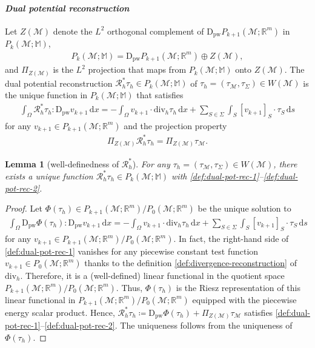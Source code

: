 \documentclass[a4paper]{amsart}
\numberwithin{equation}{section}
\newcommand{\R}{\mathbb{R}}
\renewcommand{\d}[1]{\,\mathrm{d}#1}
\renewcommand{\div}{\mathrm{div}}
\newcommand{\Mcal}{\mathcal{M}}
\newcommand{\pw}{\mathrm{pw}}
\newcommand{\D}{\mathrm{D}}
\newcommand{\M}{\mathbb{M}}
\newtheorem{lemma}[theorem]{Lemma}
\theoremstyle{remark}
\begin{document}
\paragraph{\emph{Dual potential reconstruction}}
Let $Z(\mathcal{M})$ denote the $L^2$ orthogonal complement of $\D_\pw P_{k+1}(\mathcal{M};\mathbb{R}^m)$ in $P_k(\mathcal{M}; \mathbb{M})$,
\begin{align}\label{def:orthogonal-decomposition}
	P_k(\mathcal{M}; \mathbb{M}) = \D_\pw P_{k+1}(\mathcal{M};\mathbb{R}^m) \oplus Z(\mathcal{M}),
\end{align}
and $\Pi_{Z(\Mcal)}$ is the $L^2$ projection that maps from $P_k(\mathcal{M}; \mathbb{M})$ onto $Z(\Mcal)$.
The dual potential reconstruction $\mathcal{R}_h^* \tau_h \in P_k(\mathcal{M}; \mathbb{M})$ of $\tau_h = (\tau_\Mcal,\tau_\Sigma) \in W(\Mcal)$ is 
the unique function in $P_k(\Mcal;\M)$ that satisfies
\begin{align}\label{def:dual-pot-rec-1}
	\int_\Omega \mathcal{R}_h^* \tau_h : \D_\pw v_{k+1} \d{x} = - \int_\Omega v_{k+1} \cdot \div_h \tau_h \d{x} + \sum_{S \in \Sigma} \int_S [v_{k+1}]_S \cdot \tau_S \d{s}
\end{align}
for any $v_{k+1} \in P_{k+1}(\Mcal;\R^m)$
and the projection property
\begin{align}\label{def:dual-pot-rec-2}
	\Pi_{Z(\Mcal)} \mathcal{R}_h^* \tau_h = \Pi_{Z(\Mcal)} \tau_\Mcal.
\end{align}
\begin{lemma}[well-definedness of $\mathcal{R}^*_h$]
	For any $\tau_h = (\tau_\Mcal,\tau_\Sigma) \in W(\Mcal)$, there exists a unique function $\mathcal{R}_h^* \tau_h \in P_k(\mathcal{M}; \mathbb{M})$ with \eqref{def:dual-pot-rec-1}--\eqref{def:dual-pot-rec-2}.
\end{lemma}
\begin{proof}
	Let $\Phi(\tau_h) \in P_{k+1}(\Mcal;\R^m)/P_0(\Mcal;\R^m)$ be the unique solution to
	\begin{align}\label{def:dual-pot-rec-ibp}
		\int_\Omega \D_\pw \Phi(\tau_h) : \D_\pw v_{k+1} \d{x} = - \int_\Omega v_{k+1} \cdot \div_h \tau_h \d{x} + \sum_{S \in \Sigma} \int_S [v_{k+1}]_S \cdot \tau_S \d{s}
	\end{align}
	for any $v_{k+1} \in P_{k+1}(\Mcal;\R^m)/P_0(\Mcal;\R^m)$. In fact, the right-hand side of \eqref{def:dual-pot-rec-1} vanishes for any piecewise constant test function $v_{k+1} \in P_0(\Mcal;\R^m)$ thanks to the definition \eqref{def:divergence-reconstruction} of $\div_h$. Therefore, it is a (well-defined) linear functional in the quotient space $P_{k+1}(\Mcal;\R^m)/P_0(\Mcal;\R^m)$.
	Thus, $\Phi(\tau_h)$ is the Riesz representation of this linear functional in $P_{k+1}(\Mcal;\R^m)/P_0(\Mcal;\R^m)$ equipped with the piecewise energy scalar product.
	Hence, $\mathcal{R}_h^* \tau_h \coloneqq \D_\pw \Phi(\tau_h) + \Pi_{Z(\Mcal)} \tau_\Mcal$ satisfies \eqref{def:dual-pot-rec-1}--\eqref{def:dual-pot-rec-2}. The uniqueness follows from the uniqueness of $\Phi(\tau_h)$.
\end{proof}
\end{document}
